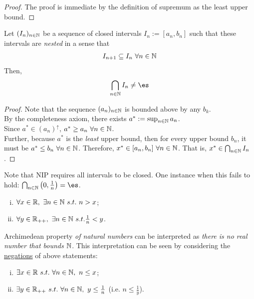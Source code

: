 \documentclass[11pt]{article}
\begin{document}
	\begin{proof}
		The proof is immediate by the definition of supremum as the least upper bound.
	\end{proof}
	
	\begin{theorem}
		Let $(I_n)_{n \in \mathbb{N}}$ be a sequence of closed intervals $I_n := [a_n, b_n]$ such that these intervals are \emph{nested} in a sense that
		\begin{align}
			I_{n+1} \subseteq I_n\ \forall n \in \mathbb{N}
		\end{align}
		Then,
		\begin{align}
			\bigcap_{n \in \N} I_n \neq \es
		\end{align}
	\end{theorem}
	
	\begin{proof}
		Note that the sequence $(a_n)_{n \in \mathbb{N}}$ is bounded above by any $b_k$.\\
		By the completeness axiom, there exists $a^* := \sup_{n \in \mathbb{N}} a_n$.\\
		Since $a^* \in (a_n)^\uparrow$, $a^* \geq a_n\ \forall n \in \mathbb{N}$.\\
		Further, because $a^*$ is the \emph{least} upper bound, then for every upper bound $b_n$, it must be $a^* \leq b_n\ \forall n \in \mathbb{N}$. Therefore, $x^* \in [a_n, b_n]\ \forall n \in \N$. That is, $x^* \in \bigcap_{n \in \mathbb{N}} I_n$.
	\end{proof}
	
	\begin{remark}
	Note that NIP requires all intervals to be closed. One instance when this fails to hold: $\bigcap_{n \in \N} \left(0, \frac{1}{n} \right) = \es$.
	\end{remark}
	
	\begin{theorem} \quad
		\begin{enumerate}[(i)]
			\item $\forall x \in \R,\ \exists n \in \N\ s.t.\ n > x$;
			\item $\forall y \in \mathbb{R}_{++},\ \exists n \in \mathbb{N}\ s.t. \frac{1}{n} < y$.
		\end{enumerate}
	\end{theorem}
	
	Archimedean property \emph{of natural numbers} can be interpreted as \emph{there is no real number that bounds $\mathbb{N}$}. This interpretation can be seen by considering the \ul{negations} of above statements:
	\begin{enumerate}[(i)]
		\item $\exists x \in \mathbb{R}\ s.t.\ \forall n \in \mathbb{N},\ n \leq x$;
		\item $\exists y \in \mathbb{R}_{++}\ s.t.\ \forall n \in \mathbb{N},\ y \leq \frac{1}{n}$ (i.e. $n \leq \frac{1}{y}$).
	\end{enumerate}
	
\end{document}
